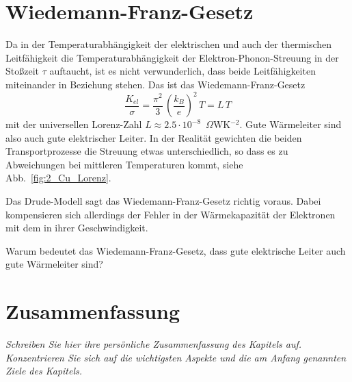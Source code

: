 \section{Wiedemann-Franz-Gesetz}

Da in der Temperaturabhängigkeit der elektrischen und auch der thermischen Leitfähigkeit die Temperaturabhängigkeit der Elektron-Phonon-Streuung in der Stoßzeit $\tau$ auftaucht, ist es nicht verwunderlich, dass beide Leitfähigkeiten miteinander in Beziehung stehen. Das ist das Wiedemann-Franz-Gesetz
\begin{equation}
   \frac{K_{el}}{\sigma} = \frac{\pi^2}{3} \, \left( \frac{k_B}{e} \right)^2 \, T = L \, T
\end{equation}
mit der universellen Lorenz-Zahl $L \approx 2.5 \cdot 10^{-8}$~$\Omega$WK$^{-2}$. Gute Wärmeleiter sind also auch gute elektrischer Leiter. In der Realität gewichten die beiden Transportprozesse die Streuung etwas unterschiedlich, so dass es zu Abweichungen bei mittleren Temperaturen kommt, siehe Abb.~\ref{fig:2_Cu_Lorenz}.

Das Drude-Modell sagt das Wiedemann-Franz-Gesetz richtig voraus. Dabei kompensieren sich allerdings der Fehler in der Wärmekapazität der Elektronen mit dem in ihrer Geschwindigkeit.

\begin{questions}
    \item  Warum bedeutet das Wiedemann-Franz-Gesetz, dass gute elektrische Leiter auch gute Wärmeleiter sind? 
\end{questions}


\newpage
\section{Zusammenfassung}

\textit{Schreiben Sie hier ihre persönliche Zusammenfassung des Kapitels auf. Konzentrieren Sie sich auf die wichtigsten Aspekte und die am Anfang genannten Ziele des Kapitels.}

 \vspace*{10cm}

\printbibliography[segment=\therefsegment,heading=subbibliography]
